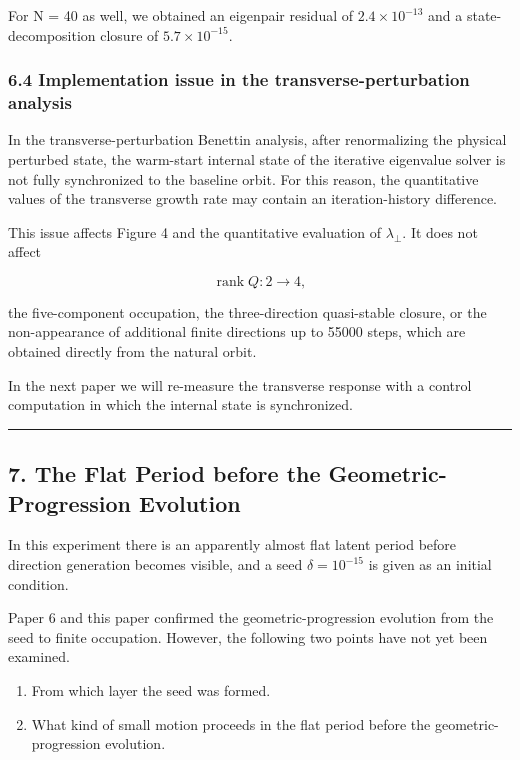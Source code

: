 \documentclass[
  a4paper,
]{article}
\providecommand{\tightlist}{%
  \setlength{\itemsep}{0pt}\setlength{\parskip}{0pt}}
\begin{document}
For N = 40 as well, we obtained an eigenpair residual of
\(2.4\times10^{-13}\) and a state-decomposition closure of
\(5.7\times10^{-15}\).

\subsubsection{6.4 Implementation issue in the transverse-perturbation
analysis}\label{implementation-issue-in-the-transverse-perturbation-analysis}

In the transverse-perturbation Benettin analysis, after renormalizing
the physical perturbed state, the warm-start internal state of the
iterative eigenvalue solver is not fully synchronized to the baseline
orbit. For this reason, the quantitative values of the transverse growth
rate may contain an iteration-history difference.

This issue affects Figure 4 and the quantitative evaluation of
\(\lambda_\perp\). It does not affect

\[
\operatorname{rank}Q:2\to4,
\]

the five-component occupation, the three-direction quasi-stable closure,
or the non-appearance of additional finite directions up to 55000 steps,
which are obtained directly from the natural orbit.

In the next paper we will re-measure the transverse response with a
control computation in which the internal state is synchronized.

\begin{center}\rule{0.5\linewidth}{0.5pt}\end{center}

\subsection{7. The Flat Period before the Geometric-Progression
Evolution}\label{the-flat-period-before-the-geometric-progression-evolution}

In this experiment there is an apparently almost flat latent period
before direction generation becomes visible, and a seed
\(\delta=10^{-15}\) is given as an initial condition.

Paper 6 and this paper confirmed the geometric-progression evolution
from the seed to finite occupation. However, the following two points
have not yet been examined.

\begin{enumerate}
\def\labelenumi{\arabic{enumi}.}
\tightlist
\item
  From which layer the seed was formed.
\item
  What kind of small motion proceeds in the flat period before the
  geometric-progression evolution.
\end{enumerate}
\end{document}
